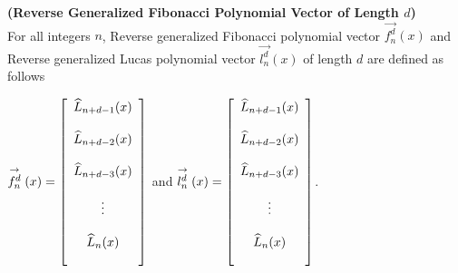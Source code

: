  \begin{definition}{\textbf{(Reverse Generalized Fibonacci Polynomial Vector of Length $d$)}}\\
 For all integers $n$, Reverse generalized Fibonacci polynomial vector $\stackrel{\rightarrow}{f_{n}^d}(x)$ and Reverse generalized Lucas polynomial  vector $\stackrel{\rightarrow}{l_{n}^d}(x)$ of length $d$ are defined as follows
  \begin{center}
   $\stackrel{\rightarrow}{f_{n}^d}(x) = 
 \left[\begin{array}{c}
           \bigskip 
           \widehat{L}_{n+d-1}(x)\\
            \bigskip 
	 	   \widehat{L}_{n+d-2}(x)\\
	 	    \bigskip 
	       \widehat{L}_{n+d-3}(x)\\
	        \bigskip 
	       \vdots\\
	        \bigskip 
	 \widehat{L}_{n}(x)
\end{array}
\right]$ and $\stackrel{\rightarrow}{l_{n}^d}(x)= 
 \left[\begin{array}{c}
           \bigskip 
         \widehat{L}_{n+d-1}(x)\\
            \bigskip 
	 	   \widehat{L}_{n+d-2}(x)\\
	 	    \bigskip 
	     \widehat{L}_{n+d-3}(x)\\
	        \bigskip 
	       \vdots\\
	        \bigskip 
	    \widehat{L}_{n}(x)
\end{array}
\right]$.
 \end{center}
 \end{definition} 
